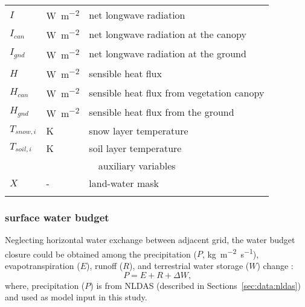 \documentclass[essd]{copernicus}
\begin{document}
\begin{table}[t]
\begin{tabular}{lll}
        $I$          & \unit{W~m^{-2}}         & net longwave radiation                    \\
        $I_{can}$    & \unit{W~m^{-2}}         & net longwave radiation at the canopy      \\
        $I_{gnd}$    & \unit{W~m^{-2}}         & net longwave radiation at the ground      \\
        $H$          & \unit{W~m^{-2}}         & sensible heat flux                        \\
        $H_{can}$    & \unit{W~m^{-2}}         & sensible heat flux from vegetation canopy \\
        $H_{gnd}$    & \unit{W~m^{-2}}         & sensible heat flux from the ground        \\
        $T_{snow,i}$ & \unit{K}                & snow layer temperature                    \\
        $T_{soil,i}$ & \unit{K}                & soil layer temperature                    \\
        [1mm]
        \multicolumn{3}{c}{auxiliary variables}                                            \\
        $X$          & \unit{-}                & land-water mask                           \\
        \bottomhline
    \end{tabular}
\end{table}


\subsubsection{surface water budget}

Neglecting horizontal water exchange between adjacent grid, the water budget closure could be obtained among the precipitation ($P$, \unit{kg~m^{-2}~s^{-1}}), evapotranspiration ($E$), runoff ($R$), and terrestrial water storage ($W$) change \citep{zheng2020JAMES}:
\begin{equation}
    P = E + R + \Delta W \text{,}
\end{equation}
where, precipitation ($P$) is from NLDAS (described in Sections~\ref{sec:data:nldas}) and used as model input in this study.
\end{document}
